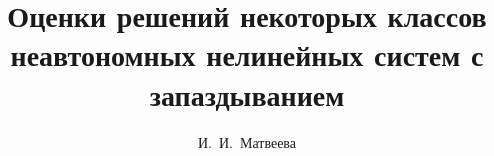 


\usepackage[russian]{nla}

%
%


%




%
\fi

\title{Оценки решений некоторых классов
неавтономных нелинейных систем с запаздыванием}
\author{И.~И.~Матвеева%
} %


\maketitle

